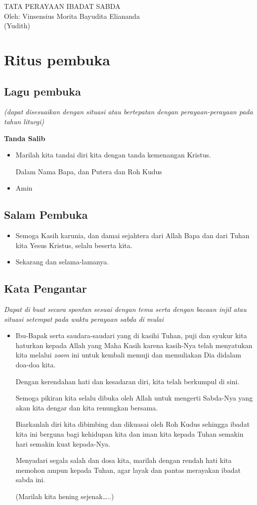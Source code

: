 \documentclass[a4paper,12pt]{article}
\title{}
\author{}
\date{2018-02-08}
\newcommand{\BU}[1]{\begin{itemize} \item[U:] #1 \end{itemize}}
\newcommand{\BP}[1]{\begin{itemize} \item[P:] #1 \end{itemize}}
\begin{document}
	\begin{center}
		\Large{TATA PERAYAAN IBADAT SABDA}\\
		\large{Oleh:}
		\large{Vinsensius Morita Bayudita Eliananda\\
		 (Yudith)}
	\end{center}

\section{Ritus pembuka}
 \subsection*{Lagu pembuka}

\textit{(dapat disesuaikan dengan situasi atau bertepatan dengan perayaan-perayaan pada tahun liturgi)
}

 \textbf{Tanda Salib}

\BP{Marilah kita tandai diri kita dengan tanda kemenangan Kristus. 

Dalam Nama Bapa, dan Putera dan Roh Kudus}

\BU{Amin}

\subsection*{Salam Pembuka}

\BP{Semoga Kasih karunia, dan damai sejahtera dari Allah Bapa dan dari Tuhan kita Yesus Kristus, selalu beserta kita.}

\BU{Sekarang dan selama-lamanya.}

 \subsection*{Kata Pengantar}

\textit{ Dapat di buat secara spontan sesuai dengan tema serta dengan bacaan injil atau situasi 
 setempat pada waktu perayaan sabda di mulai
}

\BP{Ibu-Bapak serta saudara-saudari yang di kasihi Tuhan, puji dan syukur kita haturkan kepada Allah yang Maha Kasih karena
kasih-Nya telah menyatukan kita melalui \textit{zoom} ini untuk kembali memuji dan memuliakan Dia didalam doa-doa kita.

Dengan kerendahan hati dan kesadaran diri, kita telah berkumpul di sini.

Semoga pikiran kita selalu dibuka oleh Allah untuk mengerti Sabda-Nya yang akan kita dengar dan kita renungkan bersama.

Biarkanlah diri kita dibimbing dan dikuasai oleh Roh Kudus sehingga ibadat kita ini berguna bagi kehidupan kita dan iman
kita kepada Tuhan semakin hari semakin kuat kepada-Nya.

Menyadari segala salah dan dosa kita, marilah dengan rendah hati kita memohon ampun kepada Tuhan, agar layak dan pantas
merayakan ibadat sabda ini.

(Marilah kita hening sejenak{\dots}..)
}
\end{document}
